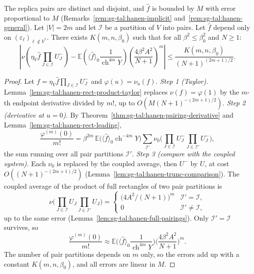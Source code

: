 \begin{proposition}\label{prop:sg-tal:hanen-truncated-rect-eval}
\leanok
{}
The replica pairs are distinct and disjoint, and $\hat f$ is bounded by $M$ with error proportional to $M$ (Remarks~\ref{rem:sg-tal:hanen-implicit} and~\ref{rem:sg-tal:hanen-general}).
Let $|V| = 2m$ and let $\mathcal I$ be a partition of $V$ into pairs.
Let $\hat f$ depend only on $(\varepsilon_\ell)_{\ell \notin V^*}$.
There exists $K(m, n, \beta_0)$ such that for all $\beta^2 \le \beta_0^2$ and $N \ge 1$:
\[
\left| \nu\left( \eta_V \hat f \prod_{J \in \mathcal I} U_J^- \right) - \mathbb E\left( \langle \hat f \rangle_0 \frac{1}{\operatorname{ch}^{4m} Y} \right) \left(\frac{4 \beta^2 A^2}{N+1}\right)^m \right|
\le \frac{K(m, n, \beta_0)}{(N+1)^{(2m+1)/2}}.
\]
\end{proposition}
\begin{proof}
\leanok
Let $f=\eta_V\hat f\prod_{J\in\mathcal I}U_J^-$ and $\varphi(u)=\nu_u(f)$.
\emph{Step 1 (Taylor).} Lemma~\ref{lem:sg-tal:hanen-rect-product-taylor} replaces $\nu(f)=\varphi(1)$ by the $m$-th endpoint derivative divided by $m!$, up to $O(M(N+1)^{-(2m+1)/2})$.
\emph{Step 2 (derivative at $u=0$).} By Theorem~\ref{thm:sg-tal:hanen-pairing-derivative} and Lemma~\ref{lem:sg-tal:hanen-rect-leading},
\[
\frac{\varphi^{(m)}(0)}{m!}=\beta^{2m}\,\mathbb E\Big(\langle\hat f\rangle_0\operatorname{ch}^{-4m}Y\Big)\sum_{\mathcal I'}\nu_0\Big(\prod_{J\in\mathcal I}U_J^-\prod_{J\in\mathcal I'}U_J^-\Big),
\]
the sum running over all pair partitions $\mathcal I'$.
\emph{Step 3 (compare with the coupled system).} Each $\nu_0$ is replaced by the coupled average, then $U^-$ by $U$, at cost $O((N+1)^{-(2m+1)/2})$ (Lemma~\ref{lem:sg-tal:hanen-trunc-comparison}). The coupled average of the product of full rectangles of two pair partitions is
\[
\nu\Big(\prod_{J\in\mathcal I}U_J\prod_{J\in\mathcal I'}U_J\Big)=\begin{cases}\big(4A^2/(N+1)\big)^m&\mathcal I'=\mathcal I,\\ 0&\mathcal I'\ne\mathcal I,\end{cases}
\]
up to the same error (Lemma~\ref{lem:sg-tal:hanen-full-pairings}). Only $\mathcal I'=\mathcal I$ survives, so
\[
\frac{\varphi^{(m)}(0)}{m!}\approx\mathbb E\Big(\langle\hat f\rangle_0\frac1{\operatorname{ch}^{4m}Y}\Big)\Big(\frac{4\beta^2A^2}{N+1}\Big)^m .
\]
The number of pair partitions depends on $m$ only, so the errors add up with a constant $K(m,n,\beta_0)$, and all errors are linear in $M$.
\end{proof}

